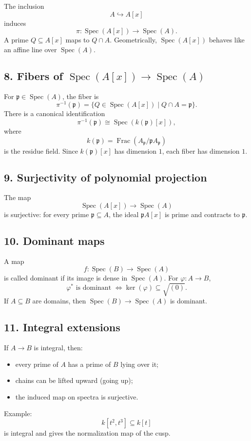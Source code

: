 \documentclass[12pt,a4paper]{article}
\theoremstyle{plain}
\theoremstyle{definition}      %
\begin{document}
The inclusion
\[
A\hookrightarrow A[x]
\]
induces
\[
\pi:\operatorname{Spec}(A[x])\to \operatorname{Spec}(A).
\]
A prime \(Q\subseteq A[x]\) maps to \(Q\cap A\). Geometrically, \(\operatorname{Spec}(A[x])\) behaves like an affine line over \(\operatorname{Spec}(A)\).

\subsection*{8. Fibers of \(\operatorname{Spec}(A[x])\to \operatorname{Spec}(A)\)}

For \(\mathfrak p\in\operatorname{Spec}(A)\), the fiber is
\[
\pi^{-1}(\mathfrak p)
=
\{Q\in\operatorname{Spec}(A[x])\mid Q\cap A=\mathfrak p\}.
\]
There is a canonical identification
\[
\pi^{-1}(\mathfrak p)\cong \operatorname{Spec}(k(\mathfrak p)[x]),
\]
where
\[
k(\mathfrak p)=\operatorname{Frac}(A_{\mathfrak p}/\mathfrak p A_{\mathfrak p})
\]
is the residue field. Since \(k(\mathfrak p)[x]\) has dimension \(1\), each fiber has dimension \(1\).

\subsection*{9. Surjectivity of polynomial projection}

The map
\[
\operatorname{Spec}(A[x])\to \operatorname{Spec}(A)
\]
is surjective: for every prime \(\mathfrak p\subseteq A\), the ideal \(\mathfrak p A[x]\) is prime and contracts to \(\mathfrak p\).

\subsection*{10. Dominant maps}

A map
\[
f:\operatorname{Spec}(B)\to \operatorname{Spec}(A)
\]
is called dominant if its image is dense in \(\operatorname{Spec}(A)\). For \(\varphi:A\to B\),
\[
\varphi^* \text{ is dominant } \iff \ker(\varphi)\subseteq \sqrt{(0)}.
\]
If \(A\subseteq B\) are domains, then \(\operatorname{Spec}(B)\to\operatorname{Spec}(A)\) is dominant.

\subsection*{11. Integral extensions}

If \(A\to B\) is integral, then:
\begin{itemize}
	\item every prime of \(A\) has a prime of \(B\) lying over it;
	\item chains can be lifted upward (going up);
	\item the induced map on spectra is surjective.
\end{itemize}
Example:
\[
k[t^2,t^3]\subseteq k[t]
\]
is integral and gives the normalization map of the cusp.
\end{document}
